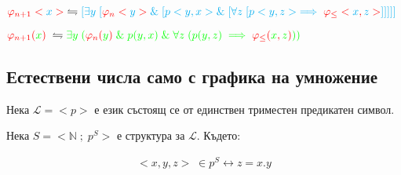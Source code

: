 \documentclass{article}[12pt]
\newcommand{\Lang}{\mathcal{L}}
\begin{document}
\(\color{red} \varphi_{n + 1}<\color{cyan} x \color{red}> \color{black} \; \leftrightharpoons \\ \color{cyan}  [\exists y \; [\color{red} \varphi_n<\color{cyan} y \color{red}> \color{cyan} \& \; [p<y, x> \& \; [\forall z \; [p<y, z> \implies \color{red} \varphi_\leq< \color{cyan} x \color{red} , \color{cyan} z \color{red}  > \color{cyan} ]]  ]]] \)

\vspace{0.3cm}

\(\color{red} \varphi_{n + 1}(\color{green} x \color{red}) \color{black} \; \leftrightharpoons \color{green}  \exists y \; (\color{red} \varphi_n(\color{green} y \color{red}) \color{green} \; \& \; p(y, x) \; \& \; \forall z \; (p(y, z) \implies \color{red} \varphi_\leq( \color{green} x \color{red} , \color{green} z \color{red} ) \color{green} )) \)

\subsection{Естествени числа само с графика на умножение}

Нека \(\Lang = <p>\) е език състоящ се от единствен триместен предикатен символ.

Нека \(S = <\mathbb{N} \; ; \; p^S>\) е структура за \(\Lang\). Където:

\begin{align*}
<x, y, z> \; \in p^S \longleftrightarrow z = x.y
\end{align*}
\end{document}
